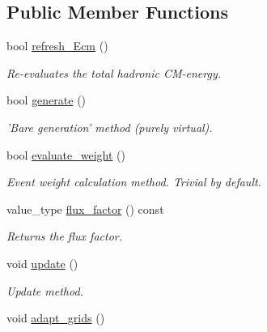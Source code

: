 \subsection*{Public Member Functions}
\begin{DoxyCompactItemize}
\item 
\hypertarget{a00259_a43bb6829df157ce9165fc076aa86c6b3}{bool \hyperlink{a00259_a43bb6829df157ce9165fc076aa86c6b3}{refresh\-\_\-\-Ecm} ()}\label{a00259_a43bb6829df157ce9165fc076aa86c6b3}

\begin{DoxyCompactList}\small\item\em Re-\/evaluates the total hadronic C\-M-\/energy. \end{DoxyCompactList}\item 
bool \hyperlink{a00259_aca3cda0f673678362fbf0300fbbc3357}{generate} ()
\begin{DoxyCompactList}\small\item\em 'Bare generation' method (purely virtual). \end{DoxyCompactList}\item 
\hypertarget{a00259_a439c9559e576d22aeffb909bfa0a5269}{bool \hyperlink{a00259_a439c9559e576d22aeffb909bfa0a5269}{evaluate\-\_\-weight} ()}\label{a00259_a439c9559e576d22aeffb909bfa0a5269}

\begin{DoxyCompactList}\small\item\em Event weight calculation method. Trivial by default. \end{DoxyCompactList}\item 
\hypertarget{a00259_a6edfec759eeffecc246c8cfec297c5f2}{value\-\_\-type \hyperlink{a00259_a6edfec759eeffecc246c8cfec297c5f2}{flux\-\_\-factor} () const }\label{a00259_a6edfec759eeffecc246c8cfec297c5f2}

\begin{DoxyCompactList}\small\item\em Returns the flux factor. \end{DoxyCompactList}\item 
void \hyperlink{a00259_a0ac611745ab0778bac2b3d895d5fdee9}{update} ()
\begin{DoxyCompactList}\small\item\em Update method. \end{DoxyCompactList}\item 
\hypertarget{a00259_aaa5b14203b9dc64944b3968efacb0842}{void \hyperlink{a00259_aaa5b14203b9dc64944b3968efacb0842}{adapt\-\_\-grids} ()}\label{a00259_aaa5b14203b9dc64944b3968efacb0842}


\end{DoxyCompactItemize}
